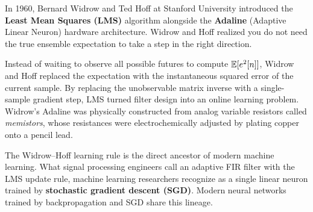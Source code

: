 \begin{connectionbox}
In 1960, Bernard Widrow and Ted Hoff at Stanford University introduced the \textbf{Least Mean Squares (LMS)} algorithm alongside the \textbf{Adaline} (Adaptive Linear Neuron) hardware architecture. Widrow and Hoff realized you do not need the true ensemble expectation to take a step in the right direction. 

Instead of waiting to observe all possible futures to compute $\operatorname{\mathbb{E}}[e^2[n]]$, Widrow and Hoff replaced the expectation with the instantaneous squared error of the current sample. By replacing the unobservable matrix inverse with a single-sample gradient step, LMS turned filter design into an online learning problem. Widrow's Adaline was physically constructed from analog variable resistors called \emph{memistors}, whose resistances were electrochemically adjusted by plating copper onto a pencil lead. 

The Widrow--Hoff learning rule is the direct ancestor of modern machine learning. What signal processing engineers call an adaptive FIR filter with the LMS update rule, machine learning researchers recognize as a single linear neuron trained by \textbf{stochastic gradient descent (SGD)}. Modern neural networks trained by backpropagation and SGD share this lineage.
\end{connectionbox}

